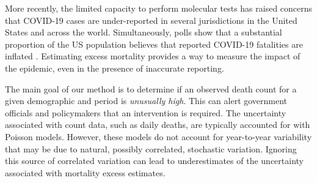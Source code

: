 \documentclass[11pt]{article}
\begin{document}
More recently, the limited capacity to perform molecular tests has raised concerns that COVID-19 cases are under-reported in several jurisdictions in the United States and across the world. Simultaneously, polls show that a substantial proportion of the US population believes that reported COVID-19 fatalities are inflated \cite{talev2020}. Estimating excess mortality provides a way to measure the impact of the epidemic, even in the presence of inaccurate reporting.


The main goal of our method is to determine if an observed death count for a given demographic and period is \textit{unusually high}. This can alert government officials and policymakers that an intervention is required. The uncertainty associated with count data, such as daily deaths, are typically accounted for with Poisson models\cite{mccullagh19831989, agresti2015foundations}. However, these models do not account for year-to-year variability that may be due to natural, possibly correlated, stochastic variation. Ignoring this source of correlated variation can lead to underestimates of the uncertainty associated with mortality excess estimates. 

\end{document}
